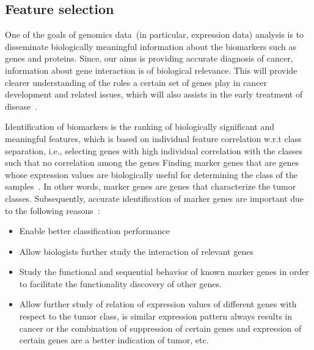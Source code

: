 \subsection{Feature selection}
One of the goals of genomics data~(in particular, expression data) analysis is to disseminate biologically meaningful information about the biomarkers such as genes and proteins. 
Since, our aims is providing accurate diagnosis of cancer, information about gene interaction is of biological relevance. This will provide clearer understanding of the roles a certain set of genes play in cancer development and related issues, which will also assists in the  early treatment of disease~\cite{lu2003cancer}. %

\hspace*{3.5mm} Identification of biomarkers is the ranking of biologically significant and meaningful features, which is based on individual feature correlation w.r.t class separation, i.e., selecting genes with high individual correlation with the classes such that no correlation among the genes Finding marker genes that are genes whose expression values are biologically useful for determining the class of the samples~\cite{lu2003cancer}. In other words, marker genes are genes that characterize the tumor classes. Subsequently, accurate identification of marker genes are important due to the following reasons~\cite{lu2003cancer}:

\begin{itemize}[noitemsep]
    \item Enable better classification performance
    \item Allow biologists further study the interaction of relevant genes 
    \item Study the functional and sequential behavior of known marker genes in order to facilitate the functionality discovery of other genes.
    \item Allow further study of relation of expression values of different genes with respect to the tumor class, is similar expression pattern always results in cancer or the combination of suppression of certain genes and expression of certain genes are a better indication of tumor, etc.
\end{itemize}


